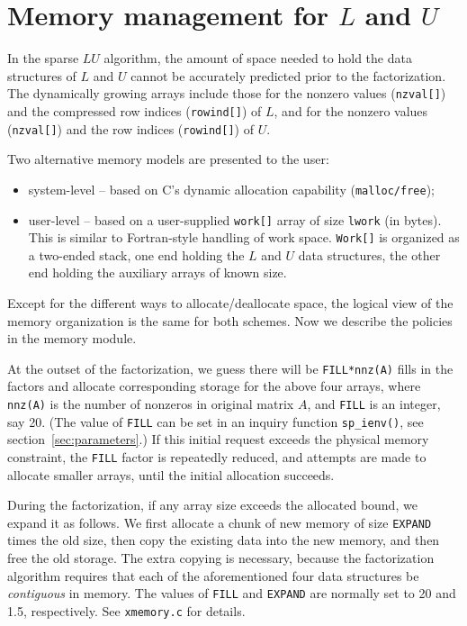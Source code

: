 \section{Memory management for $L$ and $U$}
\label{sec:mem}
In the sparse $LU$ algorithm, the amount of space needed to hold the
data structures of $L$ and $U$ cannot be accurately predicted prior to 
the factorization.
The dynamically growing arrays include those for the nonzero values
({\tt nzval[]}) and the compressed row indices ({\tt rowind[]}) of $L$, and
for the nonzero values ({\tt nzval[]}) and the row
indices ({\tt rowind[]}) of $U$.

Two alternative memory models are presented to the user:
\begin{itemize}
\item system-level -- based on C's dynamic allocation capability 
      ({\tt malloc/free});
\item user-level -- based on a user-supplied {\tt work[]} array of 
      size {\tt lwork} (in bytes). This is similar to Fortran-style
      handling of work space. {\tt Work[]} is organized as a two-ended stack, 
      one end holding the $L$ and $U$ data structures, the other end 
      holding the auxiliary arrays of known size.
\end{itemize}

Except for the different ways to allocate/deallocate space, the logical 
view of the memory organization is the same for both schemes. 
Now we describe the policies in the memory module.

At the outset of the factorization, we guess there will be {\tt FILL*nnz(A)}
fills in the factors and allocate corresponding storage for the 
above four arrays, where 
{\tt nnz(A)} is the number of nonzeros in original matrix $A$, and 
{\tt FILL} is an integer, say 20. (The value of {\tt FILL} can be
set in an inquiry function {\tt sp\_ienv()}, see section~\ref{sec:parameters}.)
If this initial request exceeds the physical memory constraint, 
the {\tt FILL} factor is repeatedly reduced, and attempts are made to 
allocate smaller arrays, until the initial allocation succeeds.

During the factorization, 
if any array size exceeds the allocated bound, we expand it
as follows. We first allocate a chunk of new memory of size {\tt EXPAND}
times the old size, then copy the existing data into the new 
memory, and then free the old storage. The extra copying is necessary,
because the factorization algorithm requires that
each of the aforementioned four data structures be {\em contiguous} in memory.
The values of {\tt FILL} and {\tt EXPAND} are normally set to 20 and 1.5, 
respectively. See {\tt xmemory.c} for details.

